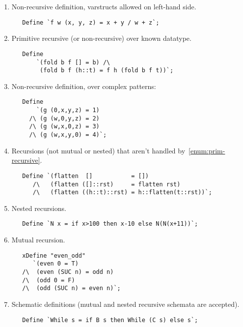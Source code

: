 \begin{enumerate}

\item Non-recursive definition, varstructs allowed on left-hand side.
\begin{verbatim}
   Define `f w (x, y, z) = x + y / w + z`;
\end{verbatim}

\item Primitive recursive (or non-recursive) over known datatype.
\label{enum:prim-recursive}

\begin{verbatim}
   Define
       `(fold b f [] = b) /\
        (fold b f (h::t) = f h (fold b f t))`;
\end{verbatim}

\item Non-recursive definition, over complex patterns:

\begin{verbatim}
   Define
       `(g (0,x,y,z) = 1)
     /\ (g (w,0,y,z) = 2)
     /\ (g (w,x,0,z) = 3)
     /\ (g (w,x,y,0) = 4)`;
\end{verbatim}

\item Recursions (not mutual or nested) that aren't handled
  by~\ref{enum:prim-recursive}.

\begin{verbatim}
   Define `(flatten  []           = [])
      /\   (flatten ([]::rst)     = flatten rst)
      /\   (flatten ((h::t)::rst) = h::flatten(t::rst))`;
\end{verbatim}

\item Nested recursions.
\begin{verbatim}
   Define `N x = if x>100 then x-10 else N(N(x+11))`;
\end{verbatim}

\item Mutual recursion.
\begin{verbatim}
   xDefine "even_odd"
      `(even 0 = T)
   /\  (even (SUC n) = odd n)
   /\  (odd 0 = F)
   /\  (odd (SUC n) = even n)`;
\end{verbatim}

\item Schematic definitions (mutual and nested recursive schemata are
         accepted).
\begin{verbatim}
   Define `While s = if B s then While (C s) else s`;
\end{verbatim}
\end{enumerate}

